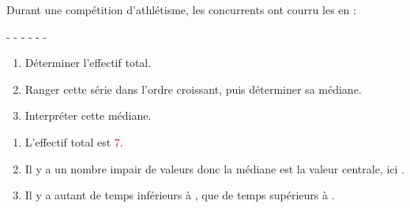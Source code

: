\begin{exercice*}
    Durant une compétition d'athlétisme, les concurrents ont courru les  en :

     -  -  -  -  -  - 
    \begin{enumerate}
        \item Déterminer l'effectif total.
        \item Ranger cette série dans l'ordre croissant, puis déterminer sa médiane.
        \item Interpréter cette médiane.
    \end{enumerate}
\end{exercice*}
\begin{corrige}
    \begin{enumerate}
        \item L'effectif total est \textcolor{red}{7}.
        \item Il y a un nombre impair de valeurs donc la médiane est la valeur centrale, ici \textcolor{red}{}.
        \item Il y a autant de temps inférieurs à , que de temps supérieurs à .
    \end{enumerate}
\end{corrige}

